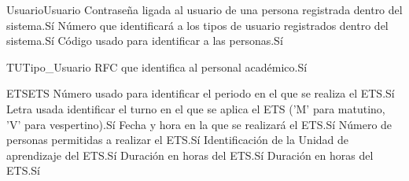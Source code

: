 \begin{cdtEntidad}{Usuario}{Usuario}
	{Contraseña ligada al usuario de una persona registrada dentro del sistema.}{Sí}
	{Número que identificará a los tipos de usuario registrados dentro del sistema.}{Sí}
	{Código usado para identificar a las personas.}{Sí}
\end{cdtEntidad}
\begin{cdtEntidad}{TU}{Tipo\_Usuario}
	{RFC que identifica al personal académico.}{Sí}
\end{cdtEntidad}
\begin{cdtEntidad}{ETS}{ETS}
	{Número usado para identificar el periodo en el que se realiza el ETS.}{Sí}
	{Letra usada identificar el turno en el que se aplica el ETS ('M' para matutino, 'V' para vespertino).}{Sí}
	{Fecha y hora en la que se realizará el ETS.}{Sí}
	{Número de personas permitidas a realizar el ETS.}{Sí}
	{Identificación de la Unidad de aprendizaje del ETS.}{Sí}
	{Duración en horas del ETS.}{Sí}
	{Duración en horas del ETS.}{Sí}
\end{cdtEntidad}
